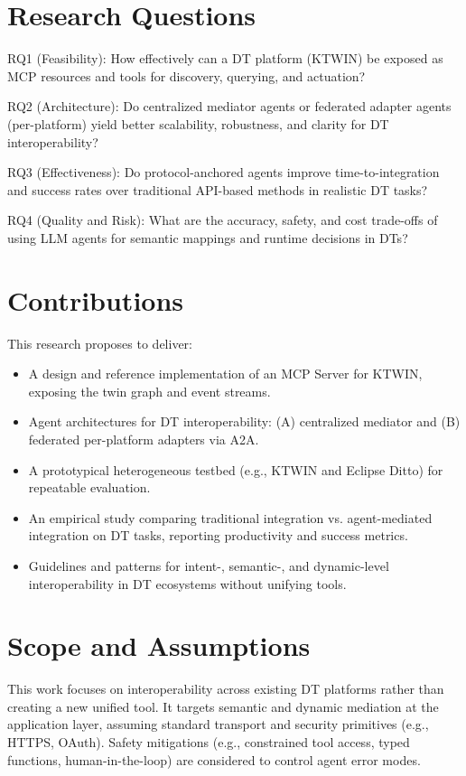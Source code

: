 \section{Research Questions}

RQ1 (Feasibility): How effectively can a DT platform (KTWIN) be exposed as MCP resources and tools for discovery, querying, and actuation?

RQ2 (Architecture): Do centralized mediator agents or federated adapter agents (per-platform) yield better scalability, robustness, and clarity for DT interoperability?

RQ3 (Effectiveness): Do protocol-anchored agents improve time-to-integration and success rates over traditional API-based methods in realistic DT tasks?

RQ4 (Quality and Risk): What are the accuracy, safety, and cost trade-offs of using LLM agents for semantic mappings and runtime decisions in DTs?

\section{Contributions}

This research proposes to deliver:
\begin{itemize}
  \item A design and reference implementation of an MCP Server for KTWIN, exposing the twin graph and event streams.
  \item Agent architectures for DT interoperability: (A) centralized mediator and (B) federated per-platform adapters via A2A.
  \item A prototypical heterogeneous testbed (e.g., KTWIN and Eclipse Ditto) for repeatable evaluation.
  \item An empirical study comparing traditional integration vs. agent-mediated integration on DT tasks, reporting productivity and success metrics.
  \item Guidelines and patterns for intent-, semantic-, and dynamic-level interoperability in DT ecosystems without unifying tools.
\end{itemize}

\section{Scope and Assumptions}

This work focuses on interoperability across existing DT platforms rather than creating a new unified tool. It targets semantic and dynamic mediation at the application layer, assuming standard transport and security primitives (e.g., HTTPS, OAuth). Safety mitigations (e.g., constrained tool access, typed functions, human-in-the-loop) are considered to control agent error modes.

